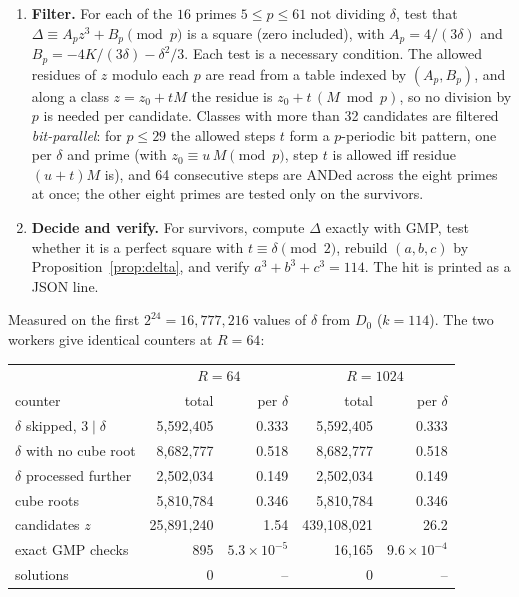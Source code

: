 \documentclass[11pt,a4paper]{article}
\theoremstyle{remark}
\begin{document}
\begin{enumerate}[leftmargin=*]
$w=(z^3-K)/\delta$, $3\delta\Delta=\delta(4w-\delta^2)$, so the condition ``$\Delta$ integral and
$9\mid\Delta$'' is exactly $4w\equiv\delta^2\pmod{27}$. For $z=r+j\delta$,
$w=w_0+3r^2j+3rj^2\delta+j^3\delta^2$ with $w_0=(r^3-K)/\delta$, so one exact product modulo
$27\delta$ per root decides every class, and $j$ is stepped directly through the residue
class mod $3$ fixed by $z\equiv\delta\pmod3$. Walk the classes over
$\lfloor3847\delta/1000\rfloor\le z\le R\delta$. Since $3.847<1/\alpha=3.84732\ldots$, no
admissible $z$ is skipped; the $k$-correction to Lemma~\ref{lem:bs} is about $10^{-30}$
relative.
\item \textbf{Filter.} For each of the $16$ primes $5\le p\le61$ not dividing $\delta$, test
that $\Delta\equiv A_pz^3+B_p\pmod p$ is a square (zero included), with $A_p=4/(3\delta)$ and
$B_p=-4K/(3\delta)-\delta^2/3$. Each test is a necessary condition. The allowed residues of $z$
modulo each $p$ are read from a table indexed by $(A_p,B_p)$, and along a class
$z=z_0+tM$ the residue is $z_0+t\,(M\bmod p)$, so no division by $p$ is needed per candidate.
Classes with more than 32 candidates are filtered \emph{bit-parallel}: for $p\le29$ the allowed
steps $t$ form a $p$-periodic bit pattern, one per $\delta$ and prime (with $z_0\equiv u\,M\pmod
p$, step $t$ is allowed iff residue $(u+t)M$ is), and 64 consecutive steps are ANDed across the
eight primes at once; the other eight primes are tested only on the survivors.
\item \textbf{Decide and verify.} For survivors, compute $\Delta$ exactly with GMP, test
whether it is a perfect square with $t\equiv\delta\pmod2$, rebuild $(a,b,c)$ by
Proposition~\ref{prop:delta}, and verify $a^3+b^3+c^3=114$. The hit is printed as a JSON
line.
\end{enumerate}

Measured on the first $2^{24}=16{,}777{,}216$ values of $\delta$ from $D_0$ ($k=114$). The
two workers give identical counters at $R=64$:

\begin{center}
\begin{tabular}{lrrrr}
\toprule
& \multicolumn{2}{c}{$R=64$} & \multicolumn{2}{c}{$R=1024$}\\
counter & total & per $\delta$ & total & per $\delta$\\
\midrule
$\delta$ skipped, $3\mid\delta$ & 5{,}592{,}405 & 0.333 & 5{,}592{,}405 & 0.333\\
$\delta$ with no cube root & 8{,}682{,}777 & 0.518 & 8{,}682{,}777 & 0.518\\
$\delta$ processed further & 2{,}502{,}034 & 0.149 & 2{,}502{,}034 & 0.149\\
cube roots & 5{,}810{,}784 & 0.346 & 5{,}810{,}784 & 0.346\\
candidates $z$ & 25{,}891{,}240 & 1.54 & 439{,}108{,}021 & 26.2\\
exact GMP checks & 895 & $5.3\times10^{-5}$ & 16{,}165 & $9.6\times10^{-4}$\\
solutions & 0 & -- & 0 & --\\
\bottomrule
\end{tabular}
\end{center}
\end{document}
